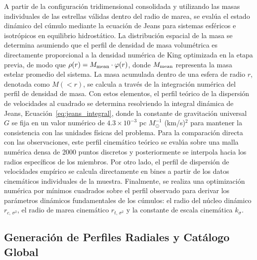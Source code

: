         A partir de la configuración tridimensional consolidada y utilizando las 
        masas individuales de las estrellas válidas dentro del radio de marea, 
        se evalúa el estado dinámico del cúmulo mediante la ecuación de Jeans 
        para sistemas esféricos e isotrópicos en equilibrio hidrostático. La 
        distribución espacial de la masa se determina asumiendo que el perfil de 
        densidad de masa volumétrica es directamente proporcional a la densidad 
        numérica de King optimizada en la etapa previa, de modo que $\rho(r) = 
        M_{\rm mean} \cdot \varphi(r)$, donde $M_{\rm mean}$ representa la masa 
        estelar promedio del sistema. La masa acumulada dentro de una esfera de 
        radio $r$, denotada como $M(<r)$, se calcula a través de la integración 
        numérica del perfil de densidad de masa. Con estos elementos, el perfil 
        teórico de la dispersión de velocidades al cuadrado se determina 
        resolviendo la integral dinámica de Jeans, 
        Ecuación~\eqref{eq:jeans_integral}, donde la constante de gravitación 
        universal $G$ se fija en un valor numérico de $4.3 \times 10^{-3}$ pc 
        $M_\odot^{-1}$ (km/s)$^2$ para mantener la consistencia con las unidades 
        físicas del problema. Para la comparación directa con las observaciones, 
        este perfil cinemático teórico se evalúa sobre una malla numérica densa 
        de 2000 puntos discretos y posteriormente se interpola hacia los radios 
        específicos de los miembros. Por otro lado, el perfil de dispersión de 
        velocidades empírico se calcula directamente en bines a partir de los 
        datos cinemáticos individuales de la muestra. Finalmente, se realiza una 
        optimización numérica por mínimos cuadrados sobre el perfil observado 
        para derivar los parámetros dinámicos fundamentales de los cúmulos: el 
        radio del núcleo dinámico $r_{c,\, \sigma^2}$, el radio de marea 
        cinemático $r_{t,\, \sigma^2}$ y la constante de escala cinemática 
        $k_\sigma$.

    \subsection{Generación de Perfiles Radiales y Catálogo Global}
    
